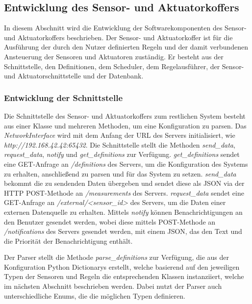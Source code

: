 \subsection{Entwicklung des Sensor- und Aktuatorkoffers}
In diesem Abschnitt wird die Entwicklung der Softwarekomponenten des Sensor- und Aktuatorkoffers beschrieben.
Der Sensor- und Aktuatorkoffer ist für die Ausführung der durch den Nutzer definierten Regeln und der damit verbundenen Ansteuerung der Sensoren und Aktuatoren zuständig.
Er besteht aus der Schnittstelle, den Definitionen, dem Scheduler, dem Regelausführer, der Sensor- und Aktuatorschnittstelle und der Datenbank.

\subsubsection{Entwicklung der Schnittstelle}
Die Schnittstelle des Sensor- und Aktuatorkoffers zum restlichen System besteht aus einer Klasse und mehreren Methoden, um eine Konfiguration zu parsen.
Das \emph{NetworkInterface} wird mit dem Anfang der URL des Servers initialisiert, wie \emph{http://192.168.42.42:65432}.
Die Schnittstelle stellt die Methoden \emph{send\_data}, \emph{request\_data}, \emph{notify} und \emph{get\_definitions} zur Verfügung.
\emph{get\_definitions} sendet eine GET-Anfrage an \emph{/definitions} des Servers, um die Konfiguration des Systems zu erhalten, anschließend zu parsen und für das System zu setzen.
\emph{send\_data} bekommt die zu sendenden Daten übergeben und sendet diese als JSON via der HTTP POST-Methode an \emph{/measurements} des Servers.
\emph{request\_data} sendet eine GET-Anfrage an \emph{/external/<sensor\_id>} des Servers, um die Daten einer externen Datenquelle zu erhalten.
Mittels \emph{notify} können Benachrichtigungen an den Benutzer gesendet werden, wobei diese mittels POST-Methode an \emph{/notifications} des Servers gesendet werden, mit einem JSON, das den Text und die Priorität der Benachrichtigung enthält.

Der Parser stellt die Methode \emph{parse\_definitions} zur Verfügung, die aus der Konfiguration Python Dictionarys erstellt, welche basierend auf den jeweiligen Typen der Sensoren und Regeln die entsprechenden Klassen instanziiert, welche im nächsten Abschnitt beschrieben werden.
Dabei nutzt der Parser auch unterschiedliche Enums, die die möglichen Typen definieren.

